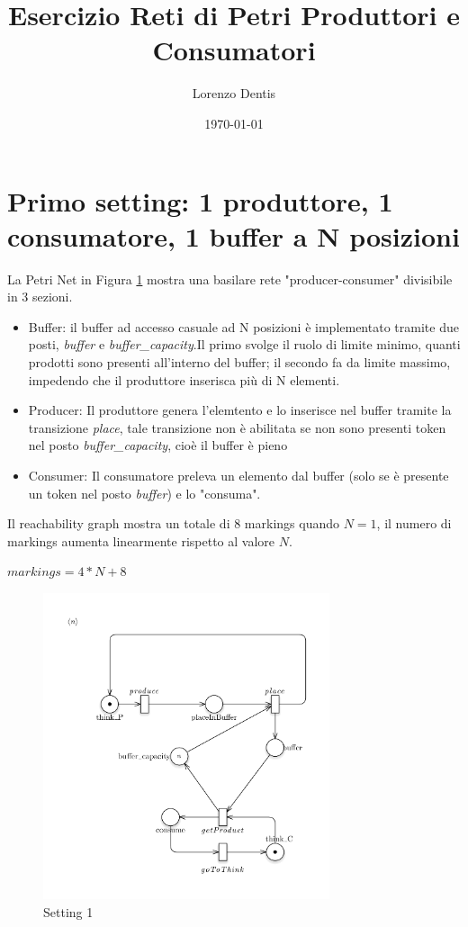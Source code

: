 \documentclass{article}
\begin{document}
\title{Esercizio Reti di Petri Produttori e Consumatori}
\author{Lorenzo Dentis}

\date{\today}

\maketitle

\section{Primo setting: 1 produttore, 1 consumatore, 1 buffer a N posizioni}\label{SEC:primo}
La Petri Net in Figura \ref{FIG:setting1} mostra una basilare rete "producer-consumer" divisibile in 3 sezioni.
\begin{itemize}
	\item Buffer: il buffer ad accesso casuale ad N posizioni è implementato tramite due posti, \emph{buffer} e \emph{buffer\_capacity}.Il primo svolge il ruolo di limite minimo, quanti prodotti sono presenti all'interno del buffer; il secondo fa da limite massimo, impedendo che il produttore inserisca più di N elementi.
	\item Producer: Il produttore genera l'elemtento e lo inserisce nel buffer tramite la transizione \emph{place}, tale transizione non è abilitata se non sono presenti token nel posto \emph{buffer\_capacity}, cioè il buffer è pieno
	\item Consumer: Il consumatore preleva un elemento dal buffer (solo se è presente un token nel posto \emph{buffer}) e lo "consuma".
\end{itemize}
Il reachability graph mostra un totale di 8 markings quando $N =1$, il numero di markings aumenta linearmente rispetto al valore $N$.\begin{center}$markings = 4*N + 8$\end{center}
\begin{figure}[!h]
\centering
\includegraphics[width=0.75\textwidth]{./Esercizio2_img/setting1.png}
\caption{Setting 1} \label{FIG:setting1}
\end{figure}
\end{document}
